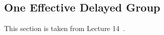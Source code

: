 \documentclass[letter]{article}
\begin{document}
\subsection{One Effective Delayed Group}

This section is taken from Lecture 14~\cite{lecture}.





\end{document}
